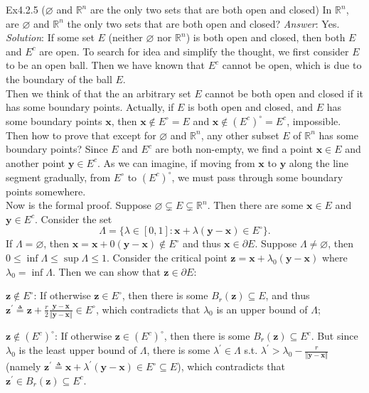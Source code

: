 \documentclass{article}
\begin{document}
\begin{Th}{Ex4.2.5 ($\varnothing$ and $\mathbb{R}^n$ are the only two sets that are both open and closed)}
    In $\mathbb{R}^n$, are $\varnothing$ and $\mathbb{R}^n$ the only two sets that are both open and closed?
    \tcblower
    \textit{Answer}: Yes.\\
    \textit{Solution}: If some set $E$ (neither $\varnothing$ nor $\mathbb{R}^n$) is both open and closed, then both $E$ and $E^c$ are open. To search for idea and simplify the thought, we first consider $E$ to be an open ball. Then we have known that $E^c$ cannot be open, which is due to the boundary of the ball $E$. \\
    Then we think of that the an arbitrary set $E$ cannot be both open and closed if it has some boundary points. Actually, if $E$ is both open and closed, and $E$ has some boundary points $\pmb{x}$, then $\pmb{x}\notin E^\circ = E$ and $\pmb{x}\notin (E^c)^\circ = E^c$, impossible. \\
    Then how to prove that except for $\varnothing$ and $\mathbb{R}^n$, any other subset $E$ of $\mathbb{R}^n$ has some boundary points? Since $E$ and $E^c$ are both non-empty, we find a point $\pmb{x}\in E$ and another point $\pmb{y}\in E^c$. As we can imagine, if moving from $\pmb{x}$ to $\pmb{y}$ along the line segment gradually, from $E^\circ$ to $(E^c)^\circ$, we must pass through some boundary points somewhere. \\
    Now is the formal proof. Suppose $\varnothing\subsetneq E\subsetneq\mathbb{R}^n$. Then there are some $\pmb{x}\in E$ and $\pmb{y}\in E^c$. Consider the set
    $$\Lambda = \{\lambda\in [0,1]: \pmb{x}+\lambda(\pmb{y}-\pmb{x})\in E^\circ\}.$$
    If $\Lambda = \varnothing$, then $\pmb{x} = \pmb{x}+0(\pmb{y}-\pmb{x})\notin E^\circ$ and thus $\pmb{x}\in\partial E$. Suppose $\Lambda\neq\varnothing$, then $0\leq\inf\Lambda\leq\sup\Lambda\leq 1$. Consider the critical point $\pmb{z} = \pmb{x}+\lambda_0(\pmb{y}-\pmb{x})$ where $\lambda_0 = \inf\Lambda$. Then we can show that $\pmb{z}\in\partial E$:
    \begin{compactenum}
        \item $\pmb{z}\notin E^\circ$: If otherwise $\pmb{z}\in E^\circ$, then there is some $B_r(\pmb{z})\subseteq E$, and thus $\pmb{z}^\prime\triangleq \pmb{z}+\frac{r}{2}\frac{\pmb{y}-\pmb{x}}{\Vert\pmb{y}-\pmb{x}\Vert}\in E^\circ$, which contradicts that $\lambda_0$ is an upper bound of $\Lambda$;
        \item $\pmb{z}\notin (E^c)^\circ$: If otherwise $\pmb{z}\in (E^c)^\circ$, then there is some $B_r(\pmb{z})\subseteq E^c$. But since $\lambda_0$ is the least upper bound of $\Lambda$, there is some $\lambda^\prime\in\Lambda$ s.t. $\lambda^\prime>\lambda_0-\frac{r}{\Vert\pmb{y}-\pmb{x}\Vert}$ (namely $\pmb{z}^\prime \triangleq \pmb{x}+\lambda^\prime(\pmb{y}-\pmb{x})\in E^\circ\subseteq E$), which contradicts that $\pmb{z}^\prime\in B_r(\pmb{z})\subseteq E^c$.
    \end{compactenum}
\end{Th} 
\end{document}
